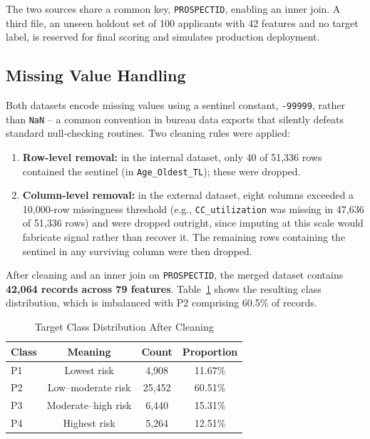 \documentclass[conference]{IEEEtran}
\begin{document}
The two sources share a common key, \texttt{PROSPECTID}, enabling an inner join. A third file, an unseen holdout set of 100 applicants with 42 features and no target label, is reserved for final scoring and simulates production deployment.

\subsection{Missing Value Handling}

Both datasets encode missing values using a sentinel constant, \texttt{-99999}, rather than \texttt{NaN} -- a common convention in bureau data exports that silently defeats standard null-checking routines. Two cleaning rules were applied:

\begin{enumerate}
    \item \textbf{Row-level removal:} in the internal dataset, only 40 of 51{,}336 rows contained the sentinel (in \texttt{Age\_Oldest\_TL}); these were dropped.
    \item \textbf{Column-level removal:} in the external dataset, eight columns exceeded a 10{,}000-row missingness threshold (e.g., \texttt{CC\_utilization} was missing in 47{,}636 of 51{,}336 rows) and were dropped outright, since imputing at this scale would fabricate signal rather than recover it. The remaining rows containing the sentinel in any surviving column were then dropped.
\end{enumerate}

After cleaning and an inner join on \texttt{PROSPECTID}, the merged dataset contains \textbf{42{,}064 records across 79 features}. Table~\ref{tab:target_dist} shows the resulting class distribution, which is imbalanced with P2 comprising 60.5\% of records.

\begin{table}[htbp]
\caption{Target Class Distribution After Cleaning}
\label{tab:target_dist}
\centering
\begin{tabular}{lccc}
\toprule
\textbf{Class} & \textbf{Meaning} & \textbf{Count} & \textbf{Proportion} \\
\midrule
P1 & Lowest risk & 4{,}908 & 11.67\% \\
P2 & Low--moderate risk & 25{,}452 & 60.51\% \\
P3 & Moderate--high risk & 6{,}440 & 15.31\% \\
P4 & Highest risk & 5{,}264 & 12.51\% \\
\bottomrule
\end{tabular}
\end{table}
\end{document}
